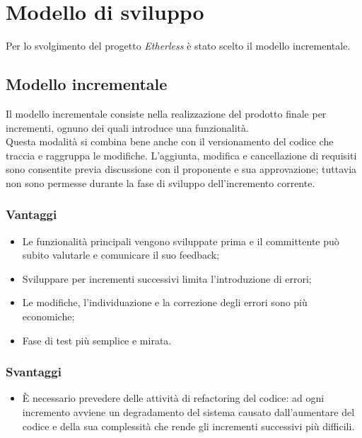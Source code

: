 \section{Modello di sviluppo}
Per lo svolgimento del progetto \textit{Etherless} è stato scelto il modello incrementale.

\subsection{Modello incrementale}
Il modello incrementale consiste nella realizzazione del prodotto finale per incrementi, ognuno dei quali introduce una funzionalità. \\Questa modalità si combina bene anche con il versionamento del codice che traccia e raggruppa le modifiche. L'aggiunta, modifica e cancellazione di requisiti sono consentite previa discussione con il proponente e sua approvazione; tuttavia non sono permesse durante la fase di sviluppo dell'incremento corrente.
\subsubsection{Vantaggi}
\begin{itemize}
	\item Le funzionalità principali vengono sviluppate prima e il committente può subito valutarle e comunicare il suo feedback;
	\item Sviluppare per incrementi successivi limita l'introduzione di errori;
	\item Le modifiche, l'individuazione e la correzione degli errori sono più economiche;
	\item Fase di test più semplice e mirata.
\end{itemize}
\subsubsection{Svantaggi}
\begin{itemize}
	\item È necessario prevedere delle attività di refactoring del codice: ad ogni incremento avviene un degradamento del sistema causato dall'aumentare del codice e della sua complessità che rende gli incrementi successivi più difficili.
\end{itemize}